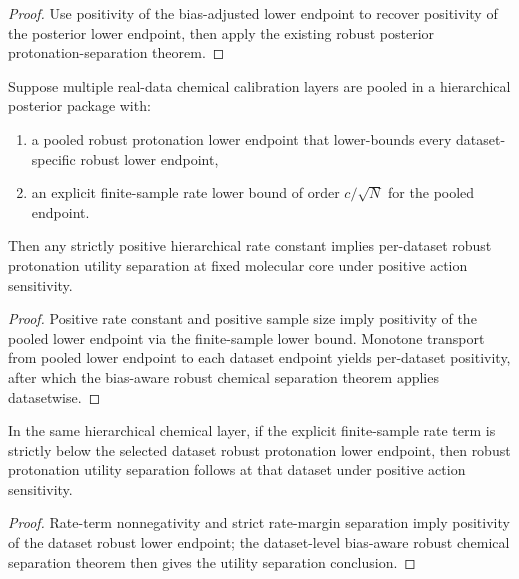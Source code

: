 \begin{proof}
Use positivity of the bias-adjusted lower endpoint to recover positivity of the posterior lower endpoint, then apply the existing robust posterior protonation-separation theorem.
\end{proof}

\begin{theorem}\label{thm:hierarchical-chemical-realdata-separation-rate}
Suppose multiple real-data chemical calibration layers are pooled in a hierarchical posterior package with:
\begin{enumerate}
\item a pooled robust protonation lower endpoint that lower-bounds every dataset-specific robust lower endpoint,
\item an explicit finite-sample rate lower bound of order $c/\sqrt{N}$ for the pooled endpoint.
\end{enumerate}
Then any strictly positive hierarchical rate constant implies per-dataset robust protonation utility separation at fixed molecular core under positive action sensitivity.
\end{theorem}

\begin{proof}
Positive rate constant and positive sample size imply positivity of the pooled lower endpoint via the finite-sample lower bound. Monotone transport from pooled lower endpoint to each dataset endpoint yields per-dataset positivity, after which the bias-aware robust chemical separation theorem applies datasetwise.
\end{proof}

\begin{theorem}\label{thm:hierarchical-chemical-realdata-separation-rate-margin}
In the same hierarchical chemical layer, if the explicit finite-sample rate term is strictly below the selected dataset robust protonation lower endpoint, then robust protonation utility separation follows at that dataset under positive action sensitivity.
\end{theorem}

\begin{proof}
Rate-term nonnegativity and strict rate-margin separation imply positivity of the dataset robust lower endpoint; the dataset-level bias-aware robust chemical separation theorem then gives the utility separation conclusion.
\end{proof}

